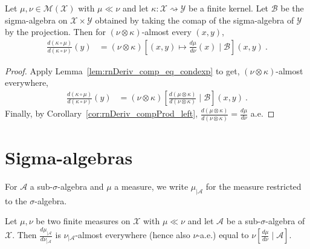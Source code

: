 \begin{lemma}
  \label{lem:rnDeriv_comp_eq_condexp_right}
  \leanok
  \uses{}
  Let $\mu, \nu \in \mathcal M(\mathcal X)$ with $\mu \ll \nu$ and let $\kappa : \mathcal X \rightsquigarrow \mathcal Y$ be a finite kernel.
  Let $\mathcal B$ be the sigma-algebra on $\mathcal X \times \mathcal Y$ obtained by taking the comap of the sigma-algebra of $\mathcal Y$ by the projection.
  Then for $(\nu \otimes \kappa)$-almost every $(x,y)$,
  \begin{align*}
  \frac{d(\kappa \circ \mu)}{d(\kappa \circ \nu)}(y)
  &= (\nu \otimes \kappa)\left[ (x, y) \mapsto \frac{d \mu}{d \nu}(x) \mid \mathcal B \right](x,y)
  \: .
  \end{align*}
  
\end{lemma}

\begin{proof}\leanok
{}
Apply Lemma~\ref{lem:rnDeriv_comp_eq_condexp} to get, $(\nu \otimes \kappa)$-almost everywhere,
\begin{align*}
\frac{d(\kappa \circ \mu)}{d(\kappa \circ \nu)}(y)
&= (\nu \otimes \kappa)\left[ \frac{d (\mu \otimes \kappa)}{d (\nu \otimes \kappa)} \mid \mathcal B\right](x,y)
\: .
\end{align*}
Finally, by Corollary~\ref{cor:rnDeriv_compProd_left}, $\frac{d (\mu \otimes \kappa)}{d (\nu \otimes \kappa)} = \frac{d \mu}{d \nu}$ a.e.
\end{proof}


\section{Sigma-algebras}

For $\mathcal A$ a sub-$\sigma$-algebra and $\mu$ a measure, we write $\mathcal \mu_{| \mathcal A}$ for the measure restricted to the $\sigma$-algebra.

\begin{lemma}
  \label{lem:rnDeriv_trim_of_ac}
  \leanok
  Let $\mu, \nu$ be two finite measures on $\mathcal X$ with $\mu \ll \nu$ and let $\mathcal A$ be a sub-$\sigma$-algebra of $\mathcal X$.
  Then $\frac{d \mu_{| \mathcal A}}{d \nu_{| \mathcal A}}$ is $\nu_{| \mathcal A}$-almost everywhere (hence also $\nu$-a.e.) equal to $\nu\left[ \frac{d \mu}{d \nu} \mid \mathcal A\right]$.
\end{lemma}


